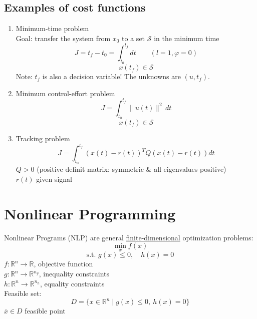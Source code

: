 \documentclass[12pt,a4paper,oneside]{scrartcl}
\begin{document}
	\subsection*{Examples of cost functions}
	\begin{enumerate}[label=\arabic*)]
		\item Minimum-time problem\\
		Goal: transfer the system from $x_0$ to a set $\mathcal{S}$ in the minimum time
		\[
		J = t_f-t_0 = \int_{t_0}^{t_f}dt \qquad (l=1, \varphi=0)
		\]
		\[
		x(t_f) \in \mathcal{S}
		\]
		Note: $t_f$ is also a decision variable! The unknowns are $(u,t_f)$.
		
		\item Minimum control-effort problem
		\[
		J = \int_{t_0}^{t_f} \|u(t)\|^2 \, dt
		\]
		\[
		x(t_f) \in \mathcal{S}
		\]
		
		\item Tracking problem
		\[
		J = \int_{t_0}^{t_f} (x(t)-r(t))^T Q (x(t)-r(t))dt
		\]
		$Q > 0$ (positive definit matrix: symmetric \& all eigenvalues positive) \\
		$r(t)$ given signal
	\end{enumerate}
	
	\section{Nonlinear Programming}
	
	Nonlinear Programs (NLP) are general \underline{finite-dimensional} optimization problems:
	\[
	\underset{x}{\min} f(x)
	\]
	\[
	\text{s.t. } g(x)\leq0, \quad h(x)=0
	\]
	$f: \mathbb{R}^n \rightarrow \mathbb{R}$, objective function\\
	$g: \mathbb{R}^n \rightarrow \mathbb{R}^{n_g}$, inequality constraints\\
	$h: \mathbb{R}^n \rightarrow \mathbb{R}^{n_h}$, equality constraints\\
	Feasible set:
	\[
	D = \{x\in\mathbb{R}^n \mid g(x)\leq0,\ h(x)=0\}
	\]
	$\overline{x}\in D$ feasible point
	
\end{document}
